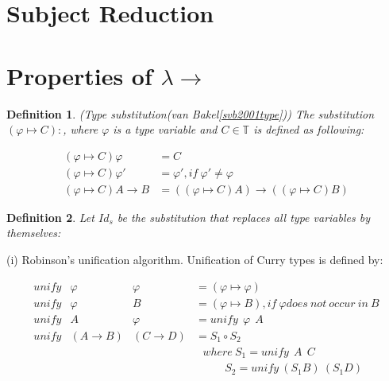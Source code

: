 \documentclass[a4paper,11pt,twoside]{report}
\newtheorem{def1}{\textbf{Definition}}[chapter]
\begin{document}
\section{Subject Reduction}

\section{Properties of $\lambda \rightarrow $}

\begin{def1}
\normalfont (Type substitution(van Bakel\ref{svb2001type})) The substitution $(\varphi \mapsto C): $, where $\varphi$ is a type variable and $C \in \mathbb{T}$ is defined as following:
\end{def1}

\begin{equation*}
\begin{array}{ll}
(\varphi \mapsto C)\varphi        & = C\\
(\varphi \mapsto C)\varphi '      & = \varphi ',if\ \varphi '\neq \varphi\\
(\varphi \mapsto C)A\rightarrow B & = ((\varphi \mapsto C)A)\rightarrow ((\varphi \mapsto C)B)
\end{array}
\end{equation*}


\begin{def1}
\normalfont Let $Id_s$ be the substitution that replaces all type variables by themselves:
\end{def1}

\noindent (i) Robinson's unification algorithm. Unification of Curry types is defined by:

\begin{equation*}
\begin{array}{llll}
unify & \varphi            & \varphi          & = (\varphi \mapsto \varphi)\\
unify & \varphi            & B                & = (\varphi \mapsto B), if\ \varphi does\ not\ occur\ in\ B\\
unify & A                  & \varphi          & = unify\ \ \varphi\ \ A\\
unify & (A\rightarrow B)   & (C\rightarrow D) & = S_1\circ S_2\\
&&&\ \ \ where\ S_1 = unify\ \ A\ \ C\\
&&&\ \ \ \ \ \ \ \ \ \ \ \ S_2 = unify\ (S_1B)\ (S_1D)
\end{array}
\end{equation*}
\end{document}
